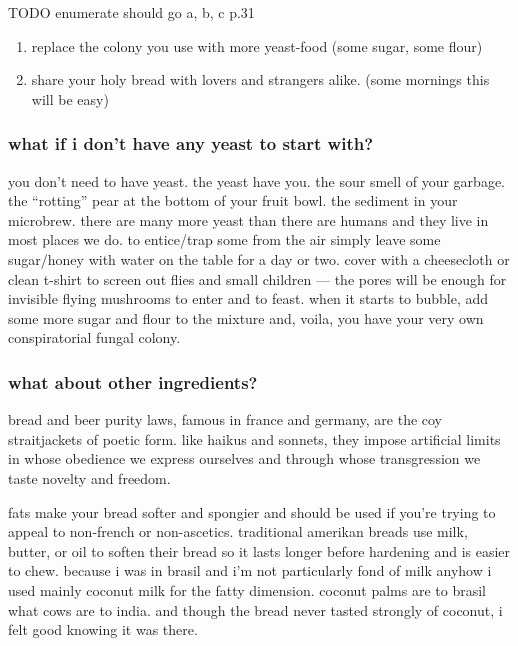 TODO enumerate should go a, b, c p.31
\begin{enumerate}

  \item replace the colony you use with more yeast-food (some sugar,
  some flour)

  \item share your holy bread with lovers and strangers alike. (some
  mornings this will be easy)

\end{enumerate}

\subsubsection{what if i don't have any yeast to start with?}

you don't need to have yeast. the yeast have you. the sour smell of
your garbage. the ``rotting'' pear at the bottom of your fruit
bowl. the sediment in your microbrew. there are many more yeast than
there are humans and they live in most places we do. to entice/trap
some from the air simply leave some sugar/honey with water on the
table for a day or two. cover with a cheesecloth or clean t-shirt to
screen out flies and small children --- the pores will be enough for
invisible flying mushrooms to enter and to feast. when it starts to
bubble, add some more sugar and flour to the mixture and, voila, you
have your very own conspiratorial fungal colony.

\subsubsection{what about other ingredients?}

bread and beer purity laws, famous in france and germany, are the coy
straitjackets of poetic form. like haikus and sonnets, they impose
artificial limits in whose obedience we express ourselves and through
whose transgression we taste novelty and freedom.

fats make your bread softer and spongier and should be used if
you're trying to appeal to non-french or non-ascetics. traditional
amerikan breads use milk, butter, or oil to soften their bread so it
lasts longer before hardening and is easier to chew. because i was in
brasil and i'm not particularly fond of milk anyhow i used mainly
coconut milk for the fatty dimension. coconut palms are to brasil what
cows are to india. and though the bread never tasted strongly of
coconut, i felt good knowing it was there.

